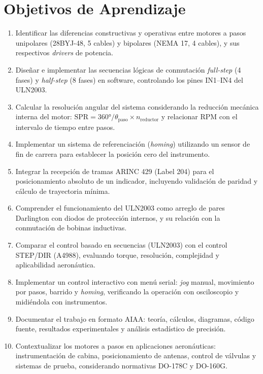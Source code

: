 \documentclass[11pt]{article}
\begin{document}
\section{Objetivos de Aprendizaje}
\begin{enumerate}
  \item Identificar las diferencias constructivas y operativas entre motores a pasos
        unipolares (28BYJ-48, 5 cables) y bipolares (NEMA 17, 4 cables), y sus
        respectivos \emph{drivers} de potencia.
  \item Diseñar e implementar las secuencias lógicas de conmutación \emph{full-step}
        (4 fases) y \emph{half-step} (8 fases) en software, controlando los pines
        IN1--IN4 del ULN2003.
  \item Calcular la resolución angular del sistema considerando la reducción mecánica
        interna del motor: $\text{SPR}=360\si{\degree}/\theta_\text{paso}\times
        n_\text{reductor}$ y relacionar RPM con el intervalo de tiempo entre pasos.
  \item Implementar un sistema de referenciación (\emph{homing}) utilizando un sensor de
        fin de carrera para establecer la posición cero del instrumento.
  \item Integrar la recepción de tramas ARINC 429 (Label 204) para el posicionamiento
        absoluto de un indicador, incluyendo validación de paridad y cálculo de
        trayectoria mínima.
  \item Comprender el funcionamiento del ULN2003 como arreglo de pares Darlington con
        diodos de protección internos, y su relación con la conmutación de bobinas
        inductivas.
  \item Comparar el control basado en secuencias (ULN2003) con el control STEP/DIR
        (A4988), evaluando torque, resolución, complejidad y aplicabilidad aeronáutica.
  \item Implementar un control interactivo con menú serial: \emph{jog} manual,
        movimiento por pasos, barrido y \emph{homing}, verificando la operación con
        osciloscopio y midiéndola con instrumentos.
  \item Documentar el trabajo en formato AIAA: teoría, cálculos, diagramas, código
        fuente, resultados experimentales y análisis estadístico de precisión.
  \item Contextualizar los motores a pasos en aplicaciones aeronáuticas: instrumentación
        de cabina, posicionamiento de antenas, control de válvulas y sistemas de
        prueba, considerando normativas DO-178C y DO-160G.
\end{enumerate}
\end{document}
